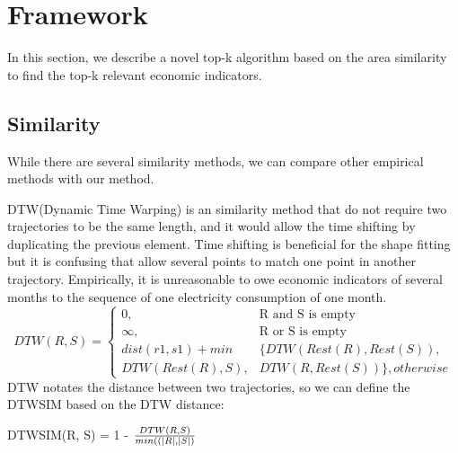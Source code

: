 
\section{Framework} \label{sec:alg}
In this section, we describe a novel top-k algorithm based on the area similarity to find the top-k relevant economic indicators. 
\subsection{Similarity}

While there are several similarity methods, we can compare other empirical methods with our method. 

DTW(Dynamic Time Warping) is an similarity method that do not require two trajectories to be the same length, and it would allow the time shifting by duplicating the previous element.  Time shifting is beneficial for the shape fitting but it is confusing that allow several points to match one point in another trajectory. Empirically, it is unreasonable to owe economic indicators of several months to the sequence of one electricity consumption of one month.
\begin{equation}
	DTW(R, S) = \left\{
	\begin{array}{ll}
		0,  & \text{R and S is empty}  \\
		\infty,  & \text{R or S is empty}  \\
		dist(r1, s1) + min & \{DTW(Rest(R), Rest(S)),  \\
		 DTW(Rest(R), S), & DTW(R, Rest(S))\}, otherwise
	\end{array}
	\right.
\end{equation} 
DTW notates the distance between two trajectories, so we can define the DTWSIM based on the DTW distance:
\begin{definition}
	DTWSIM(R, S) = 1 - $\frac{DTW(R, S)}{min(\text(|R|, |S|)}$
\end{definition}

